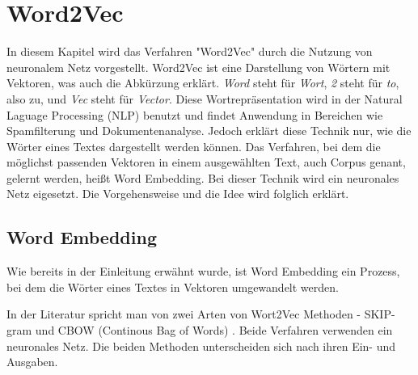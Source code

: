 \chapter{Word2Vec}\label{word2vec}

In diesem Kapitel wird das Verfahren "Word2Vec" durch die Nutzung von neuronalem Netz vorgestellt. Word2Vec ist eine Darstellung von Wörtern mit Vektoren, was auch die Abkürzung erklärt. \textit{Word} steht für \textit{Wort}, \textit{2} steht für \textit{to}, also zu, und \textit{Vec} steht für \textit{Vector}. Diese Wortrepräsentation wird in der Natural Laguage Processing (NLP) benutzt und findet Anwendung in Bereichen wie Spamfilterung und Dokumentenanalyse. Jedoch erklärt diese Technik nur, wie die Wörter eines Textes dargestellt werden können. Das Verfahren, bei dem die möglichst passenden Vektoren in einem ausgewählten Text, auch Corpus genant, gelernt werden, heißt Word Embedding. Bei dieser Technik wird ein neuronales Netz eigesetzt. Die Vorgehensweise und die Idee wird folglich erklärt.

\section{Word Embedding}

Wie bereits in der Einleitung erwähnt wurde, ist Word Embedding ein Prozess, bei dem die Wörter eines Textes in Vektoren umgewandelt werden. 

%
%
%

In der Literatur spricht man von zwei Arten von Wort2Vec Methoden - SKIP-gram und CBOW (Continous Bag of Words) \cite{Ali:19}. Beide Verfahren verwenden ein neuronales Netz. Die beiden Methoden unterscheiden sich nach ihren Ein- und Ausgaben.   


